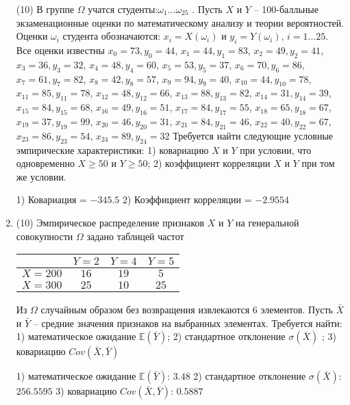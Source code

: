 \documentclass[a4paper,14pt]{article}
\begin{document}
\begin{enumerate}
(10) В группе $\Omega$ учатся студенты:$\omega _{1}...\omega _{25}$ . Пусть $X$ и $Y$ – 100-балльные экзаменационные оценки по
математическому анализу и теории вероятностей. Оценки $\omega _{i}$ студента обозначаются: $x _{i} = X(\omega _{i})$ и $y _{i} = Y(\omega _{i})$, $i = 1...25$. Все оценки известны
$x _{0} = 73, y _{0} = 44$, $x _{1} = 44, y _{1} = 83$, $x _{2} = 49, y _{2} = 41$, $x _{3} = 36, y _{3} = 32$, $x _{4} = 48, y _{4} = 60$, $x _{5} = 53, y _{5} = 37$, $x _{6} = 70, y _{6} = 86$, $x _{7} = 61, y _{7} = 82$, $x _{8} = 42, y _{8} = 57$, $x _{9} = 94, y _{9} = 40$, $x _{10} = 44, y _{10} = 78$, $x _{11} = 85, y _{11} = 78$, $x _{12} = 48, y _{12} = 66$, $x _{13} = 88, y _{13} = 82$, $x _{14} = 31, y _{14} = 39$, $x _{15} = 84, y _{15} = 68$, $x _{16} = 49, y _{16} = 51$, $x _{17} = 84, y _{17} = 55$, $x _{18} = 65, y _{18} = 67$, $x _{19} = 37, y _{19} = 99$, $x _{20} = 46, y _{20} = 31$, $x _{21} = 84, y _{21} = 46$, $x _{22} = 40, y _{22} = 67$, $x _{23} = 86, y _{23} = 54$, $x _{24} = 89, y _{24} = 32$
Требуется
найти следующие условные эмпирические характеристики: 1) ковариацию $X$ и $Y$ при условии, что одновременно $X \geqslant 50$
 и $Y \geqslant 50$; 2) коэффициент корреляции $X$ и $Y$ при том же условии.




1) Ковариация = $-345.5$
2) Коэффициент корреляции = $-2.9554$


\item


(10) Эмпирическое распределение признаков $X$ и $Y$ на генеральной совокупности $\Omega$ задано таблицей частот  
 
\begin{tabular}{ | c | c | c | c | }
\hline
 & $Y = 2$ & $Y = 4$ & $Y = 5$  \\ \hline
$X = 200$ & $16$ & $19$ & $5$\\ \hline
$X = 300$ & $25$ & $10$ & $25$\\
\hline
\end{tabular}

Из $\Omega$ случайным образом без возвращения извлекаются $6$ элементов. 
Пусть $\bar X$ и $\bar Y$ – средние значения признаков на выбранных элементах. 
Требуется найти: 1) математическое ожидание $\mathbb{E}(\bar Y)$; 2) стандартное отклонение $\sigma(\bar X)$ ; 
3) ковариацию $Cov(\bar X, \bar Y)$




1) математическое ожидание $\mathbb{E}(\bar Y)$: $3.48$ 
2) стандартное отклонение $\sigma(\bar X)$: $256.5595$
3) ковариацию $Cov(\bar X, \bar Y)$: $0.5887$



\end{enumerate}
\end{document}

